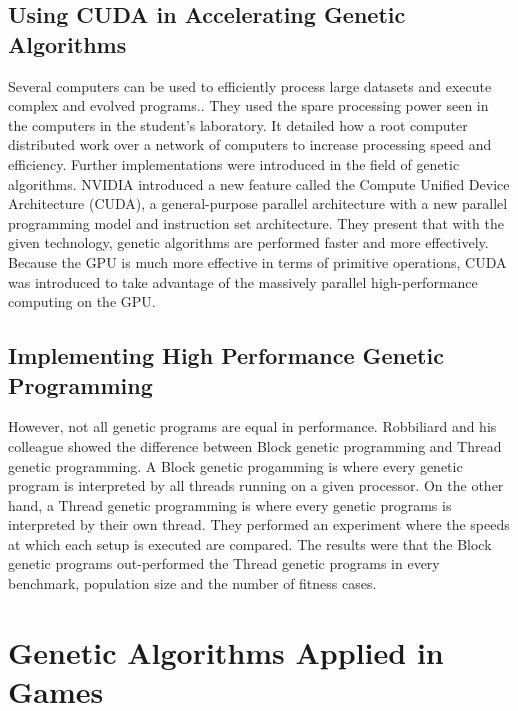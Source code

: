 \subsection{Using CUDA in Accelerating Genetic Algorithms}
Several computers can be used to efficiently process large datasets and execute complex
and evolved programs.\cite{Harding09}. They used the spare processing power seen in the
computers in the student's laboratory. It detailed how a root computer distributed work
over a network of computers to increase processing speed and efficiency. Further
implementations were introduced in the field of genetic algorithms. NVIDIA introduced a new 
feature called the Compute Unified Device Architecture (CUDA),
a general-purpose parallel architecture with a new parallel programming model and instruction
set architecture\cite{Zhang09}. They present that with the given technology, genetic algorithms
are performed faster and more effectively. Because the GPU is much more effective in terms of primitive
operations, CUDA was introduced to take advantage of the massively parallel high-performance
computing on the GPU.  

\subsection{Implementing High Performance Genetic Programming}
However, not all genetic programs are equal in performance. Robbiliard and his colleague showed the difference between
Block genetic programming and Thread genetic programming\cite{Robbilliard09}. A Block
genetic progamming is where every genetic program is interpreted by all threads running
on a given processor. On the other hand, a Thread genetic programming is where every genetic
programs is interpreted by their own thread. They performed an experiment where
the speeds at which each setup is executed are compared. The results were that the Block genetic
programs out-performed the Thread genetic programs in every benchmark, population size and
the number of fitness cases.

\section{Genetic Algorithms Applied in Games}
